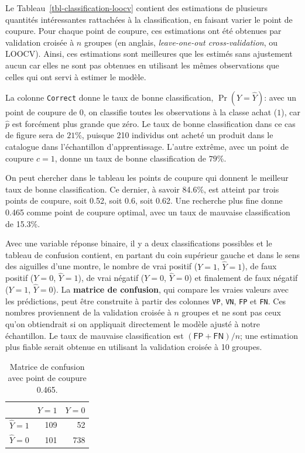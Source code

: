 \documentclass[
  11pt,
  letterpaper,
]{book}
\theoremstyle{definition}
\theoremstyle{remark}
\begin{document}
Le Tableau~\ref{tbl-classification-loocv} contient des estimations de
plusieurs quantités intéressantes rattachées à la classification, en
faisant varier le point de coupure. Pour chaque point de coupure, ces
estimations ont été obtenues par validation croisée à \(n\) groupes (en
anglais, \emph{leave-one-out cross-validation}, ou LOOCV). Ainsi, ces
estimations sont meilleures que les estimés sans ajustement aucun car
elles ne sont pas obtenues en utilisant les mêmes observations que
celles qui ont servi à estimer le modèle.

La colonne \texttt{Correct} donne le taux de bonne classification,
\(\Pr(Y = \widehat{Y})\): avec un point de coupure de \(0\), on
classifie toutes les observations à la classe achat (\(1\)), car
\(\widehat{p}\) est forcément plus grande que zéro. Le taux de bonne
classification dans ce cas de figure sera de \(21\)\%, puisque 210
individus ont acheté un produit dans le catalogue dans l'échantillon
d'apprentissage. L'autre extrême, avec un point de coupure \(c=1\),
donne un taux de bonne classification de \(79\)\%.

On peut chercher dans le tableau les points de coupure qui donnent le
meilleur taux de bonne classification. Ce dernier, à savoir 84.6\%, est
atteint par trois points de coupure, soit 0.52, soit 0.6, soit 0.62. Une
recherche plus fine donne 0.465 comme point de coupure optimal, avec un
taux de mauvaise classification de 15.3\%.

Avec une variable réponse binaire, il y a deux classifications possibles
et le tableau de confusion contient, en partant du coin supérieur gauche
et dans le sens des aiguilles d'une montre, le nombre de vrai positif
(\(Y=1\), \(\widehat{Y}=1\)), de faux positif (\(Y=0\),
\(\widehat{Y}=1\)), de vrai négatif (\(Y=0\), \(\widehat{Y}=0\)) et
finalement de faux négatif (\(Y=1\), \(\widehat{Y}=0\)). La
\textbf{matrice de confusion}, qui compare les vraies valeurs avec les
prédictions, peut être construite à partir des colonnes \texttt{VP},
\texttt{VN}, \texttt{FP} et \texttt{FN}. Ces nombres proviennent de la
validation croisée à \(n\) groupes et ne sont pas ceux qu'on obtiendrait
si on appliquait directement le modèle ajusté à notre échantillon. Le
taux de mauvaise classification est \((\mathsf{FP}+\mathsf{FN})/n\); une
estimation plus fiable serait obtenue en utilisant la validation croisée
à 10 groupes.

\hypertarget{tbl-confumat}{}
\begin{table}
\caption{\label{tbl-confumat}Matrice de confusion avec point de coupure 0.465. }\tabularnewline

\centering
\begin{tabular}{lrr}
\toprule
  & \(Y=1\) & \(Y=0\)\\
\midrule
\(\widehat{Y}=1\) & 109 & 52\\
\(\widehat{Y}=0\) & 101 & 738\\
\bottomrule
\end{tabular}
\end{table}
\end{document}
